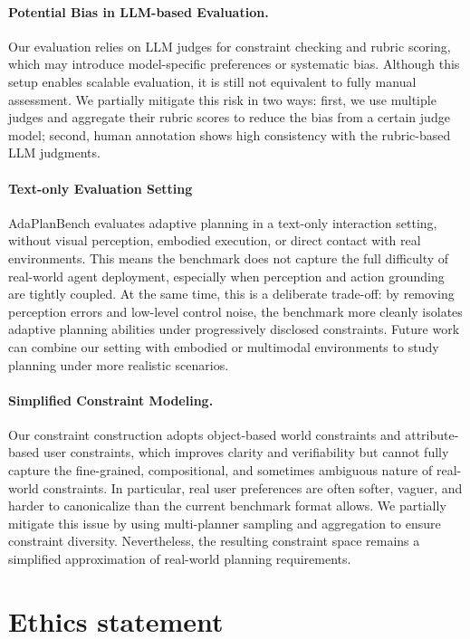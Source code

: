 \documentclass{article} %
\begin{document}
\paragraph{Potential Bias in LLM-based Evaluation.}
Our evaluation relies on LLM judges for constraint checking and rubric scoring, which may introduce model-specific preferences or systematic bias. Although this setup enables scalable evaluation, it is still not equivalent to fully manual assessment. We partially mitigate this risk in two ways: first, we use multiple judges and aggregate their rubric scores to reduce the bias from a certain judge model; second, human annotation shows high consistency with the rubric-based LLM judgments. 

\paragraph{Text-only Evaluation Setting}
AdaPlanBench evaluates adaptive planning in a text-only interaction setting, without visual perception, embodied execution, or direct contact with real environments. This means the benchmark does not capture the full difficulty of real-world agent deployment, especially when perception and action grounding are tightly coupled. At the same time, this is a deliberate trade-off: by removing perception errors and low-level control noise, the benchmark more cleanly isolates adaptive planning abilities under progressively disclosed constraints. Future work can combine our setting with embodied or multimodal environments to study planning under more realistic scenarios.

\paragraph{Simplified Constraint Modeling.}
Our constraint construction adopts object-based world constraints and attribute-based user constraints, which improves clarity and verifiability but cannot fully capture the fine-grained, compositional, and sometimes ambiguous nature of real-world constraints. In particular, real user preferences are often softer, vaguer, and harder to canonicalize than the current benchmark format allows. We partially mitigate this issue by using multi-planner sampling and aggregation to ensure constraint diversity. Nevertheless, the resulting constraint space remains a simplified approximation of real-world planning requirements.

\section*{Ethics statement}
\end{document}
